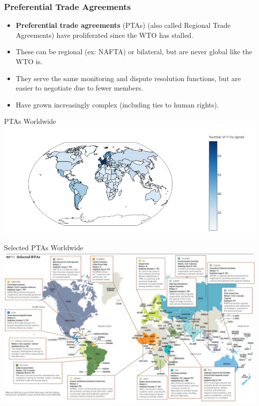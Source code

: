 \documentclass{beamer}
\begin{document}
\begin{frame} 
	\frametitle{\LARGE{Preferential Trade Agreements}}
	\begin{itemize}
			\item \textbf{Preferential trade agreements} (PTAs) (also called Regional Trade Agreements) have proliferated since the WTO has stalled. \pause
			\item These can be regional (ex: NAFTA) or bilateral, but are never global like the WTO is. \pause
			\item They serve the same monitoring and dispute resolution functions, but are easier to negotiate due to fewer members. \pause
			\item Have grown increasingly complex (including ties to human rights).
	\end{itemize}
\end{frame}

\begin{frame}{\LARGE PTAs Worldwide}
	\centering
	\includegraphics[width=\textwidth,height=0.8\textheight,keepaspectratio]{number of PTAs.JPG}
\end{frame}

\begin{frame}{\LARGE Selected PTAs Worldwide}
	\centering
	\includegraphics[width=\textwidth,height=0.8\textheight,keepaspectratio]{RTAs.JPG}
\end{frame}
\end{document}
